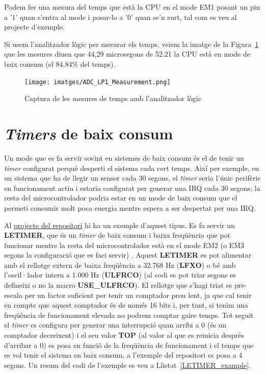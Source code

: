 Podem fer una mesura del temps que està la CPU en el mode EM1 posant un pin a '1' quan s'entra al mode i posar-lo a '0' quan se'n surt, tal com es veu al projecte d'exemple.

Si usem l'analitzador lògic per mesurar els temps, veiem la imatge de la Figura~\ref{fig:adc_logic} que les mesures diuen que 44,29 microsegons de 52.21 la CPU està en mode de baix consum (el 84.84\% del temps).

\begin{figure}
 \centering
 \texttt{[image: imatges/ADC\_LP1\_Measurement.png]}
 \caption{Captura de les mesures de temps amb l'analitzador lògic}
 \label{fig:adc_logic}
\end{figure}

\section{{\em Timers} de baix consum}
\label{sub:letimer_example}
Un mode que es fa servir sovint en sistemes de baix consum és el de tenir un {\em timer} configurat perquè desperti el sistema cada cert temps. Així per exemple, en un sistema que ha de llegir un sensor cada 30 segons, el {\em timer} seria l'únic perifèric en funcionament actiu i estaria configurat per generar una \gls{IRQ} cada 30 segons; la resta del microcontrolador podria estar en un mode de baix consum que el permeti consumir molt poca energia mentre espera a ser despertat per una \gls{IRQ}.

Al \href{https://github.com/mariusmm/cursembedded/tree/master/Simplicity/LETIMER_LP}{projecte del repositori} hi ha un exemple d'aquest tipus. Es fa servir un {\bf LETIMER}, que és un {\em timer} de baix consum i baixa freqüència que pot funcionar mentre la resta del microcontrolador està en el mode EM2 (o EM3 segons la configuració que es faci servir) \cite[294]{EFM32TGRM}. Aquest {\bf LETIMER} es pot alimentar amb el rellotge extern de baixa freqüència a 32.768 Hz ({\bf LFXO}) o bé amb l'oscil·lador intern a 1.000 Hz ({\bf ULFRCO}) (al codi es pot triar segons es defineixi o no la macro {\bf USE\_ULFRCO}). El rellotge que s'hagi triat es pre-escala per un factor suficient per tenir un comptador prou lent, ja que cal tenir en compte que aquest comptador és de només 16 bits i, per tant, si tenim una freqüència de funcionament elevada no podrem comptar gaire temps.
Tot seguit el {\em timer} es configura per generar una interrupció quan arribi a 0 (és un comptador decreixent) i el seu valor {\bf TOP} (al valor al que es reinicia després d'arribar a 0) es posa en funció de la freqüència de funcionament i el temps que es vol tenir el sistema en baix consum, a l'exemple del repositori es posa a 4 segons. Un resum del codi de l'exemple es veu a Llistat~\ref{LETIMER_example}.

